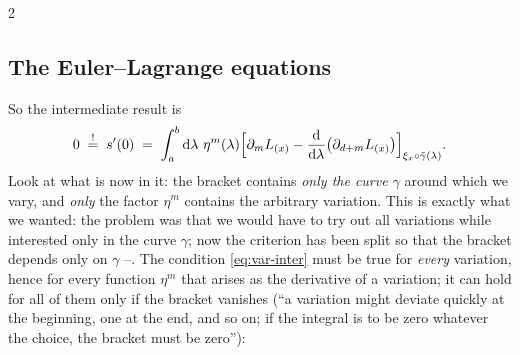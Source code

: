 \begin{paracol}{2}
\subsection{The Euler--Lagrange equations}\label{ssec:var-theorem}

So the intermediate result is
\begin{equation}\label{eq:var-inter}
  0\;\overset!=\;s'(0)\;=\;\int_a^b\mathrm d\lambda\ \eta^m(\lambda)\Bigl[\partial_mL_{(x)}-\frac{\mathrm d}{\mathrm d\lambda}\bigl(\partial_{d+m}L_{(x)}\bigr)\Bigr]_{\xi_x\circ\tilde\gamma(\lambda)}.
\end{equation}
Look at what is now in it: the bracket contains \emph{only the curve $\gamma$} around which we vary, and \emph{only} the factor $\eta^m$ contains the arbitrary variation. This is exactly what we wanted: the problem was that we would have to try out all variations while interested only in the curve $\gamma$; now the criterion has been split so that the bracket depends only on $\gamma$ --. The condition \eqref{eq:var-inter} must be true for \emph{every} variation, hence for every function $\eta^m$ that arises as the derivative of a variation; it can hold for all of them only if the bracket vanishes (``a variation might deviate quickly at the beginning, one at the end, and so on; if the integral is to be zero whatever the choice, the bracket must be zero''):


\end{paracol}
